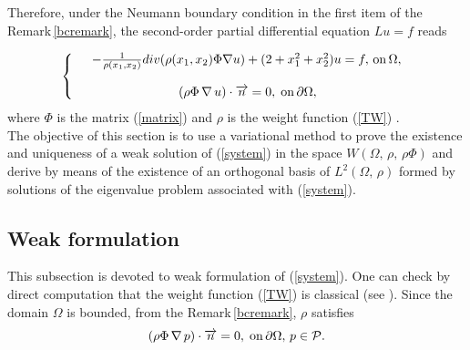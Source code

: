 \documentclass[11pt]{article}
\begin{document}
	Therefore, under the Neumann boundary condition in the first item of the Remark\,\ref{bcremark}, the second-order partial differential equation $Lu=f$ reads
	
	\begin{eqnarray}\label{system}
	\left\{\begin{array}{ccc}
			&-\frac{1}{\rho(x_1,x_2)}div(\rho(x_1,x_2)\Phi\nabla u)+(2+{x_1^2+x_2^2})u=f\label{Helm1},\,{\rm on}\,\Omega,\, \\
			\\
			&
			\left(\rho \Phi\,\nabla\,u\right)\cdot\overrightarrow{n}=0,\;{\rm on}\,\partial\Omega  \label{Hembc},
		\end{array}\right.
	\end{eqnarray}
	where $\varPhi$ is the matrix (\ref{matrix}) and $\rho$ is the weight function  (\ref{TW}) .\\
	The objective of this section is to use a variational method to prove the existence and uniqueness of a weak solution of (\ref{system})  in the space $W\left(\Omega,\, \rho,\,\rho\Phi\right)$ and derive by means of  \cite[Theorem II.6.5]{BOYER} the existence of an orthogonal basis of $L^2(\Omega,\, \rho)$ formed by solutions of the eigenvalue problem associated with (\ref{system}). 

	\subsection{Weak formulation}
	This subsection is devoted to weak formulation of (\ref{system}).
	One can check by direct computation that the weight function (\ref{TW}) is classical (see \cite{NJN}). Since the domain $\Omega$ is bounded, from the Remark\,\ref{bcremark}, $\rho$ satisfies 
	\begin{equation}\label{pbc}
		\left(\rho \Phi\,\nabla\,p\right)\cdot\overrightarrow{n}=0,\;{\rm on}\,\partial\Omega,\,p\in \mathcal{P}.
	\end{equation}
	
\end{document}
